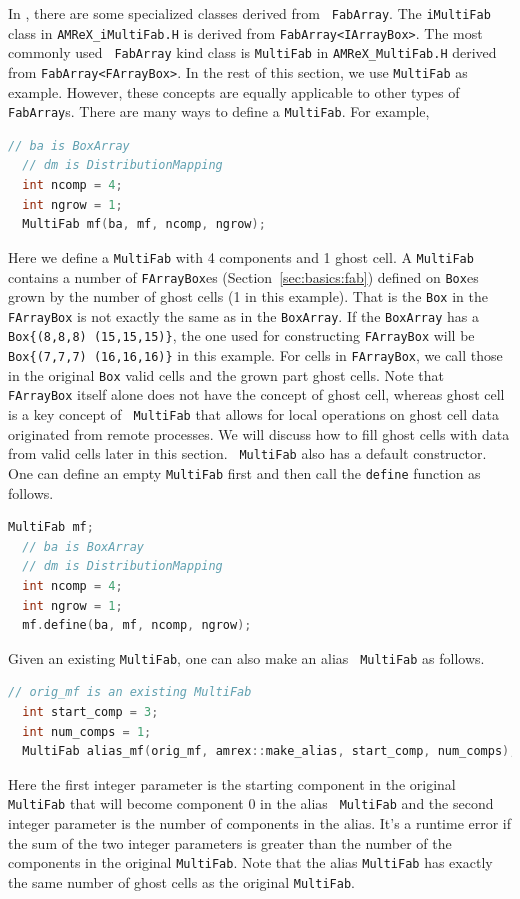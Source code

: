 {{In \amrex, there are some specialized classes derived from {\tt
  FabArray}.  The {\tt iMultiFab} class in {\tt AMReX\_iMultiFab.H} is
derived from {\tt FabArray<IArrayBox>}.  The most commonly used {\tt
  FabArray} kind class is {\tt MultiFab} in {\tt AMReX\_MultiFab.H}
derived from {\tt FabArray<FArrayBox>}.  In the rest of this section,
we use {\tt MultiFab} as example.  However, these concepts are equally
applicable to other types of {\tt FabArray}s.  There are many ways to
define a {\tt MultiFab}.  For example,
\begin{lstlisting}[language=cpp]
  // ba is BoxArray
  // dm is DistributionMapping
  int ncomp = 4;
  int ngrow = 1;
  MultiFab mf(ba, mf, ncomp, ngrow);
\end{lstlisting}
Here we define a {\tt MultiFab} with 4 components and 1 ghost cell.  A
{\tt MultiFab} contains a number of {\tt FArrayBox}es
(Section~\ref{sec:basics:fab}) defined on {\tt Box}es grown by the
number of ghost cells (1 in this example).  That is the {\tt Box} in
the {\tt FArrayBox} is not exactly the same as in the {\tt BoxArray}.
If the {\tt BoxArray} has a {\tt Box\{(8,8,8) (15,15,15)\}}, the one
used for constructing {\tt FArrayBox} will be {\tt Box\{(7,7,7)
  (16,16,16)\}} in this example.  For cells in {\tt FArrayBox}, we
call those in the original {\tt Box} valid cells and the grown part
ghost cells.  Note that {\tt FArrayBox} itself alone does not have the
concept of ghost cell, whereas ghost cell is a key concept of {\tt
  MultiFab} that allows for local operations on ghost cell data
originated from remote processes.  We will discuss how to fill ghost
cells with data from valid cells later in this section.  {\tt
  MultiFab} also has a default constructor.  One can define an empty
{\tt MultiFab} first and then call the {\tt define} function as
follows.
\begin{lstlisting}[language=cpp]
  MultiFab mf;
  // ba is BoxArray
  // dm is DistributionMapping
  int ncomp = 4;
  int ngrow = 1;
  mf.define(ba, mf, ncomp, ngrow);
\end{lstlisting}
Given an existing {\tt MultiFab}, one can also make an alias {\tt
  MultiFab} as follows.
\begin{lstlisting}[language=cpp]
  // orig_mf is an existing MultiFab
  int start_comp = 3;
  int num_comps = 1;
  MultiFab alias_mf(orig_mf, amrex::make_alias, start_comp, num_comps);
\end{lstlisting}
Here the first integer parameter is the starting component in the
original {\tt MultiFab} that will become component 0 in the alias {\tt
  MultiFab} and the second integer parameter is the number of
components in the alias.  It's a runtime error if the sum of the two
integer parameters is greater than the number of the components in the
original {\tt MultiFab}.  Note that the alias {\tt MultiFab} has
exactly the same number of ghost cells as the original {\tt MultiFab}.

}}
